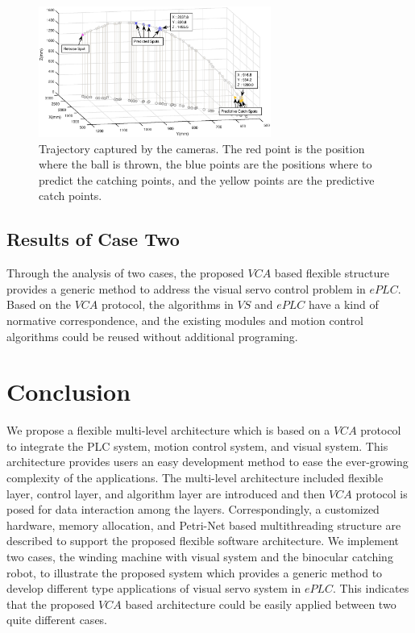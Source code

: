 \documentclass[journal,UTF8]{IEEEtran}
\begin{document}
\begin{figure}
	\centering
	\includegraphics[width=3in]{fig/PFofRobot.eps}
	\caption{ Trajectory captured by the cameras. The red point is the position where the ball is thrown, the blue points are the positions where to predict the catching points, and the yellow points are the predictive catch points.}
	\label{fig:Trajectory}
\end{figure}

\subsection{Results of Case Two}
Through the analysis of two cases, the proposed $VCA$ based flexible structure provides a generic method to address the visual servo control problem in $ePLC$. Based on the $VCA$ protocol, the algorithms in $VS$ and $ePLC$ have a kind of normative correspondence,  and the existing modules and motion control algorithms could be reused without additional programing. 
\section{Conclusion}
\label{conclusion}
We propose a flexible multi-level architecture which is based on a $VCA$ protocol to integrate the PLC system, motion control system, and visual system. This architecture provides users an easy development method to ease the ever-growing complexity of the applications. The multi-level architecture included flexible layer, control layer, and algorithm layer are introduced and then $VCA$ protocol is posed for data interaction among the layers. Correspondingly, a customized hardware, memory allocation, and Petri-Net based multithreading structure are described to support the proposed flexible software architecture. We implement two cases, the winding machine with visual system and the binocular catching robot, to illustrate the proposed system which provides a generic method to develop different type applications of visual servo system in $ePLC$. This indicates that the proposed $VCA$ based architecture could be easily applied between two quite different cases.
\end{document}
